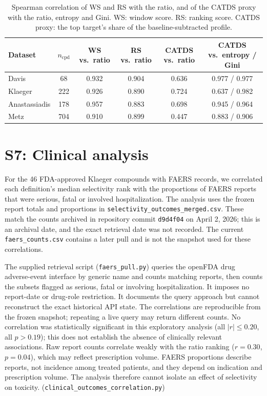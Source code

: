 \documentclass[11pt]{article}
\begin{document}
\begin{table}[h]
\centering
\caption{Spearman correlation of WS and RS with the ratio, and of the CATDS proxy
with the ratio, entropy and Gini. WS: window score. RS: ranking score.
CATDS proxy: the top target's share of the baseline-subtracted profile.}
\small
\setlength{\tabcolsep}{4pt}
\begin{tabular}{lccccc}
\toprule
Dataset & $n_\mathrm{cpd}$ & WS vs.\ ratio & RS vs.\ ratio & CATDS vs.\ ratio &
CATDS vs.\ entropy / Gini \\
\midrule
Davis         & 68  & 0.932 & 0.904 & 0.636 & 0.977 / 0.977 \\
Klaeger       & 222 & 0.926 & 0.890 & 0.724 & 0.637 / 0.982 \\
Anastassiadis & 178 & 0.957 & 0.883 & 0.698 & 0.945 / 0.964 \\
Metz          & 704 & 0.910 & 0.899 & 0.447 & 0.883 / 0.906 \\
\bottomrule
\end{tabular}
\end{table}

\section*{S7: Clinical analysis}

For the 46 FDA-approved Klaeger compounds with FAERS records, we correlated
each definition's median selectivity rank with the proportions of FAERS
reports that were serious, fatal or involved hospitalization. The analysis
uses the frozen report totals and proportions in
\texttt{selectivity\_outcomes\_merged.csv}. These match the counts archived
in repository commit \texttt{d9d4f04} on April 2, 2026; this is an archival
date, and the exact retrieval date was not recorded. The current
\texttt{faers\_counts.csv} contains a later pull and is not the snapshot
used for these correlations.

The supplied retrieval script (\texttt{faers\_pull.py}) queries the openFDA
drug adverse-event interface by generic name and counts matching reports,
then counts the subsets flagged as serious, fatal or involving
hospitalization. It imposes no report-date or drug-role restriction.
It documents the query approach but cannot reconstruct the exact historical
API state. The correlations are reproducible from the frozen snapshot;
repeating a live query may return different counts.
No correlation was statistically significant in this exploratory analysis
(all $|r| \leq 0.20$, all $p > 0.19$); this does not establish the absence of
clinically relevant associations. Raw
report counts correlate weakly with the ratio ranking ($r = 0.30$, $p = 0.04$),
which may reflect prescription volume. FAERS proportions describe reports, not
incidence among treated patients, and they depend on indication and
prescription volume. The analysis therefore cannot isolate an effect of
selectivity on toxicity.
(\texttt{clinical\_\allowbreak{}outcomes\_\allowbreak{}correlation.py})
\end{document}
